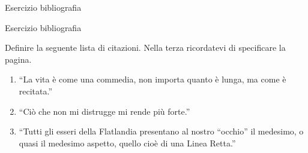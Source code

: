 \begin{frame}[fragile]{Esercizio bibliografia}

\begin{block}{Esercizio bibliografia}
    
Definire la seguente lista di citazioni.
Nella terza ricordatevi di specificare la pagina.

\begin{enumerate}
\item ``La vita è come una commedia, non importa quanto è lunga, ma come è recitata.'' \cite{seneca}
\item ``Ciò che non mi distrugge mi rende più forte.'' \cite{nietzsche}
\item ``Tutti gli esseri della Flatlandia presentano al nostro ``occhio'' il medesimo, o quasi il medesimo aspetto, quello cioè di una Linea Retta.'' \cite[p. 42]{abbot}
\end{enumerate}

\end{block}

\end{frame}
